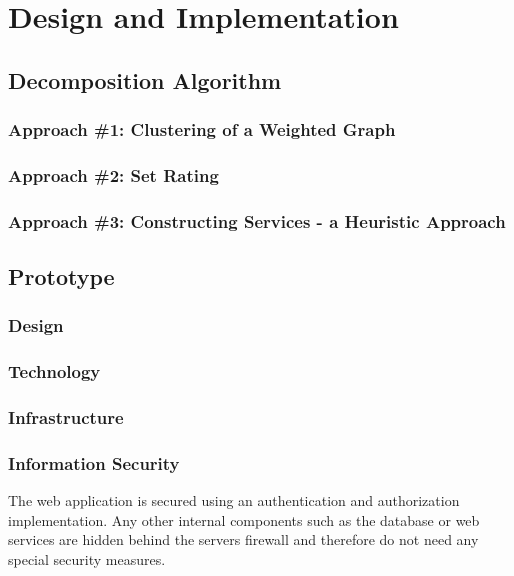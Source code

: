 
\chapter{Design and Implementation}
\label{cha:implementation}

\section{Decomposition Algorithm}

\subsection{Approach \#1: Clustering of a Weighted Graph}

\subsection{Approach \#2: Set Rating}

\subsection{Approach \#3: Constructing Services - a Heuristic Approach}

\section{Prototype} 

\subsection{Design}

\subsection{Technology}

\subsection{Infrastructure}

\subsection{Information Security}

The web application is secured using an authentication and authorization implementation. Any other internal components such as the database or web services are hidden behind the servers firewall and therefore do not need any special security measures.

